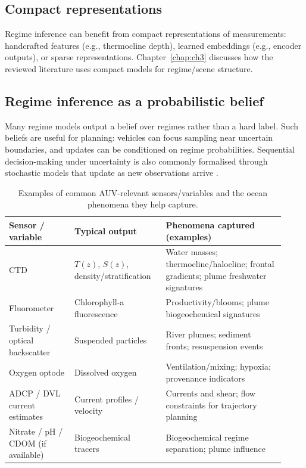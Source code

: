 \subsection{Compact representations}
Regime inference can benefit from compact representations of measurements:
handcrafted features (e.g., thermocline depth), learned embeddings (e.g., encoder outputs), or sparse representations.
Chapter~\ref{chap:ch3} discusses how the reviewed literature uses compact models for regime/scene structure.

\subsection{Regime inference as a probabilistic belief}
Many regime models output a belief over regimes rather than a hard label. Such beliefs are useful for planning:
vehicles can focus sampling near uncertain boundaries, and updates can be conditioned on regime probabilities.
Sequential decision-making under uncertainty is also commonly formalised through stochastic models that update
as new observations arrive \parencite{berget2023dynamicstochastic}.

\begin{table}[t]
  \centering
  \caption{Examples of common AUV-relevant sensors/variables and the ocean phenomena they help capture.}
  \label{tab:sensors_phenomena}
  \begin{tabular}{p{0.22\linewidth} p{0.30\linewidth} p{0.40\linewidth}}
    \hline
    \textbf{Sensor / variable} & \textbf{Typical output} & \textbf{Phenomena captured (examples)} \\
    \hline
    CTD & $T(z)$, $S(z)$, density/stratification & Water masses; thermocline/halocline; frontal gradients; plume freshwater signatures \\
    Fluorometer & Chlorophyll-a fluorescence & Productivity/blooms; plume biogeochemical signatures \\
    Turbidity / optical backscatter & Suspended particles & River plumes; sediment fronts; resuspension events \\
    Oxygen optode & Dissolved oxygen & Ventilation/mixing; hypoxia; provenance indicators \\
    ADCP / DVL current estimates & Current profiles / velocity & Currents and shear; flow constraints for trajectory planning \\
    Nitrate / pH / CDOM (if available) & Biogeochemical tracers & Biogeochemical regime separation; plume influence \\
    \hline
  \end{tabular}
\end{table}

